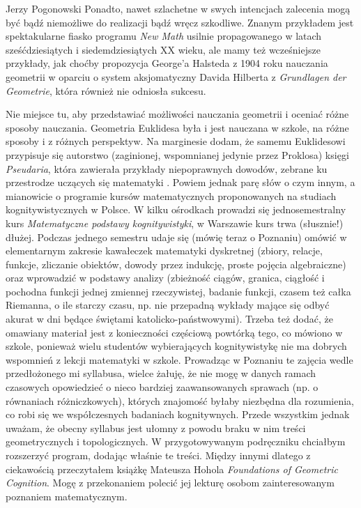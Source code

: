 \begin{newrevengenv}{Jerzy Pogonowski}
Ponadto, nawet szlachetne w swych intencjach zalecenia mogą być
bądź niemożliwe do realizacji bądź wręcz szkodliwe. Znanym
przykładem jest spektakularne fiasko programu {\em New Math}
usilnie propagowanego w latach sześćdziesiątych i
siedemdziesiątych XX wieku, ale mamy też wcześniejsze przykłady,
jak choćby propozycja George'a Halsteda z 1904 roku nauczania
geometrii w oparciu o system aksjomatyczny Davida Hilberta z {\em
Grundlagen der Geometrie}, która również nie odniosła sukcesu.

Nie miejsce tu, aby przedstawiać możliwości nauczania geometrii i
oceniać różne sposoby nauczania. Geometria Euklidesa była i jest
nauczana w szkole, na różne sposoby i z różnych perspektyw. Na
marginesie dodam, że samemu Euklidesowi przypisuje się autorstwo
(zaginionej, wspomnianej jedynie przez Proklosa) księgi {\em
Pseudaria}, która zawierała przykłady niepoprawnych dowodów,
zebrane ku przestrodze uczących się matematyki \parencite{acerbi_euclids_2008}.
Powiem jednak parę słów o czym innym, a mianowicie o programie
kursów matematycznych proponowanych na studiach kognitywistycznych
w Polsce. W kilku ośrodkach prowadzi się jednosemestralny kurs
{\em Matematyczne podstawy kognitywistyki}, w Warszawie kurs trwa
(słusznie!) dłużej. Podczas jednego semestru udaje się (mówię
teraz o Poznaniu) omówić w elementarnym zakresie kawałeczek
matematyki dyskretnej (zbiory, relacje, funkcje, zliczanie
obiektów, dowody przez indukcję, proste pojęcia algebraiczne) oraz
wprowadzić w podstawy analizy (zbieżność ciągów, granica, ciągłość
i pochodna funkcji jednej zmiennej rzeczywistej, badanie funkcji,
czasem też całka Riemanna, o ile starczy czasu, np. nie przepadną
wykłady mające się odbyć akurat w dni będące świętami
katolicko-państwowymi). Trzeba też dodać, że omawiany materiał
jest z konieczności częściową powtórką tego, co mówiono w szkole,
ponieważ wielu studentów wybierających kognitywistykę nie ma
dobrych wspomnień z lekcji matematyki w szkole. Prowadząc w
Poznaniu te zajęcia wedle przedłożonego mi syllabusa, wielce
żałuję, że nie mogę w danych ramach czasowych opowiedzieć o nieco
bardziej zaawansowanych sprawach (np. o równaniach różniczkowych),
których znajomość byłaby niezbędna dla rozumienia, co robi się we
współczesnych badaniach kognitywnych. Przede wszystkim jednak
uważam, że obecny syllabus jest ułomny z powodu braku w nim treści
geometrycznych i topologicznych. W przygotowywanym podręczniku
chciałbym rozszerzyć program, dodając właśnie te treści. Między
innymi dlatego z ciekawością przeczytałem książkę Mateusza Hohola
{\em Foundations of Geometric Cognition}. Mogę z przekonaniem
polecić jej lekturę osobom zainteresowanym poznaniem
matematycznym.





\end{newrevengenv}
